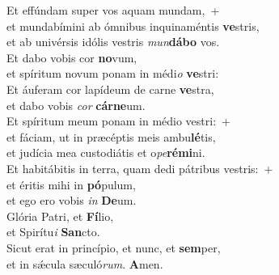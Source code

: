 \evenverse Et effúndam super vos aquam mundam,~+\\\evenverse  et mundabímini ab ómnibus inquinaméntis \textbf{ve}stris,~\*\\
\evenverse et ab univérsis idólis vestris \textit{mun}\textbf{dá}\textbf{bo} vos.\\
\oddverse Et dabo vobis cor \textbf{no}vum,~\*\\
\oddverse et spíritum novum ponam in médi\textit{o} \textbf{ve}stri:\\
\evenverse Et áuferam cor lapídeum de carne \textbf{ve}stra,~\*\\
\evenverse et dabo vobis \textit{cor} \textbf{cár}\textbf{ne}um.\\
\oddverse Et spíritum meum ponam in médio vestri:~+\\
\oddverse  et fáciam, ut in præcéptis meis ambu\textbf{lé}tis,~\*\\
\oddverse et judícia mea custodiátis et o\textit{pe}\textbf{ré}\textbf{mi}ni.\\
\evenverse Et habitábitis in terra, quam dedi pátribus vestris:~+\\
\evenverse  et éritis mihi in \textbf{pó}pulum,~\*\\
\evenverse et ego ero vobis \textit{in} \textbf{De}um.\\
\oddverse Glória Patri, et \textbf{Fí}lio,~\*\\
\oddverse et Spirítu\textit{i} \textbf{San}cto.\\
\evenverse Sicut erat in princípio, et nunc, et \textbf{sem}per,~\*\\
\evenverse et in sǽcula sæculó\textit{rum}. \textbf{A}men.\\
